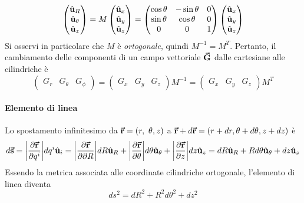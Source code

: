 \begin{equation}
	\begin{pmatrix}
		\hat{\mathbf{u}}_R\\
		\hat{\mathbf{u}}_\theta\\
		\hat{\mathbf{u}}_z
	\end{pmatrix}=M\begin{pmatrix}
		\hat{\mathbf{u}}_x\\
		\hat{\mathbf{u}}_y\\
		\hat{\mathbf{u}}_z
	\end{pmatrix}=
	\begin{pmatrix}
		\cos\theta & -\sin\theta & 0\\
		\sin\theta & \cos\theta & 0\\
		0 & 0 & 1
	\end{pmatrix}
	\begin{pmatrix}
		\hat{\mathbf{u}}_x\\
		\hat{\mathbf{u}}_y\\
		\hat{\mathbf{u}}_z
	\end{pmatrix}
\end{equation}
Si osservi in particolare che $M$ è \textit{ortogonale}, quindi $M^{-1}=M^{T}$.
Pertanto, il cambiamento delle componenti di un campo vettoriale $\vb*{\va{G}}$ dalle cartesiane alle cilindriche è
\begin{equation}
	\begin{pmatrix}
		G_r & G_\theta & G_\phi
	\end{pmatrix}=
	\begin{pmatrix}
		G_x & G_y & G_z
	\end{pmatrix}M^{-1}=
	\begin{pmatrix}
		G_x & G_y & G_z
	\end{pmatrix}M^T
\end{equation}
\paragraph{Elemento di linea}
Lo spostamento infinitesimo da $\vb*{\va{r}}=(r,\ \theta, z)$ a $\vb*{\va{r}}+d\vb*{\va{r}}=(r + dr, \theta + d\theta, z + dz)$ è
\begin{equation}
	d\vb*{\va{s}}=\abs{\pdv{\vb*{\va{r}}}{q^i}}dq^i\hat{\mathbf{u}}_i=\abs{\pdv{\vb*{\va{r}}}{\partial R}}dR\hat{\mathbf{u}}_R+\abs{\pdv{\vb*{\va{r}}}{\theta}}d\theta\hat{\mathbf{u}}_\theta+\abs{\pdv{\vb*{\va{r}}}{z}}dz\hat{\mathbf{u}}_z=dR\hat{\mathbf{u}}_R+Rd\theta\hat{\mathbf{u}}_\theta+dz\hat{\mathbf{u}}_z\label{spinfinitesimocilindriche}
\end{equation}
Essendo la metrica associata alle coordinate cilindriche ortogonale, l'elemento di linea diventa
\begin{equation}
	ds^2=dR^2+R^2d\theta^2+dz^2
\end{equation}
